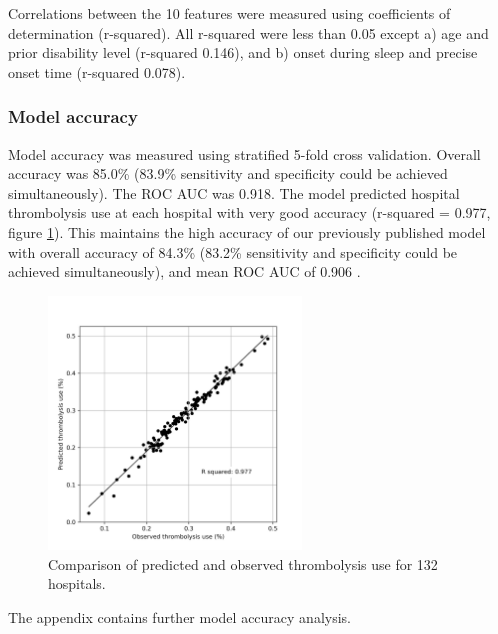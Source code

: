 Correlations between the 10 features were measured using coefficients of determination (r-squared). All r-squared were less than 0.05 except a) age and prior disability level (r-squared 0.146), and b) onset during sleep and precise onset time (r-squared 0.078).


\subsubsection{Model accuracy}

Model accuracy was measured using stratified 5-fold cross validation. Overall accuracy was 85.0\% (83.9\% sensitivity and specificity could be achieved simultaneously). The ROC AUC was 0.918. The model predicted hospital thrombolysis use at each hospital with very good accuracy (r-squared = 0.977, figure \ref{fig:thrombolysis_pred_observed}). This maintains the high accuracy of our previously published model with overall accuracy of 84.3\% (83.2\% sensitivity and specificity could be achieved simultaneously), and mean ROC AUC of 0.906 \cite{allen_use_2022}.

\begin{figure}
\centering
\includegraphics[width=0.6\textwidth]{./images/02_xgb_10_features_observed_predicted_rates}
\caption{Comparison of predicted and observed thrombolysis use for 132 hospitals.}
\label{fig:thrombolysis_pred_observed}
\end{figure}

The appendix contains further model accuracy analysis.

